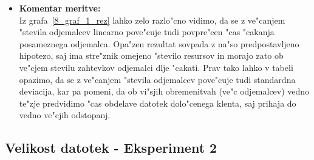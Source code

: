 \begin{itemize}
    \pagebreak
	\item \textbf{Komentar meritve: } \\ 
		Iz grafa~\ref{8_graf_1_rez} lahko zelo razlo"cno vidimo, da se z ve"canjem "stevila odjemalcev linearno pove"cuje tudi povpre"cen "cas "cakanja posameznega odjemalca. Opa"zen rezultat sovpada z na"so predpostavljeno hipotezo, saj ima stre"znik omejeno "stevilo resursov in morajo zato ob ve"cjem stevilu zahtevkov odjemalci dlje "cakati. Prav tako lahko v tabeli opazimo, da se z ve"canjem "stevila odjemalcev pove"cuje tudi standardna deviacija, kar pa pomeni, da ob vi"sjih obremenitvah (ve"c odjemalcev) vedno te"zje predvidimo "cas obdelave datotek dolo"cenega klenta, saj prihaja do vedno ve"cjih odstopanj.
\end{itemize}

\newpage
\subsection{Velikost datotek - Eksperiment 2}
\label{8_subsec:eksperiment_2}
